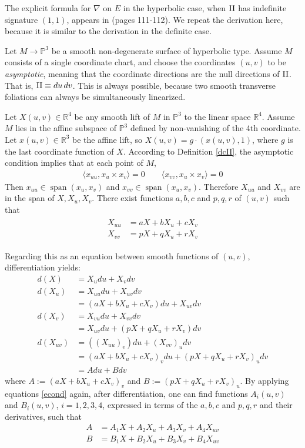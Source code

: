 \documentclass[12pt]{article}
\numberwithin{equation}{section}
\theoremstyle{plain}
\theoremstyle{definition}
\renewcommand{\P}{\mathbb{P}}
\newcommand{\R}{\mathbb{R}}
\newcommand{\II}{\textnormal{II}}
\newcommand{\ra}{\rightarrow}
\begin{document}
The explicit formula for $\nabla$ on $E$ in the hyperbolic case, when $\II$ has indefinite signature $(1,1)$, appears in \cite{to} (pages 111-112). We repeat the derivation here, because it is similar to the derivation in the definite case.

Let $M\ra \P^{3}$ be a smooth non-degenerate surface of hyperbolic type. Assume $M$ consists of a single coordinate chart, and choose the coordinates $(u,v)$ to be \emph{asymptotic}, meaning that the coordinate directions are the null directions of $\II$. That is, $\II\equiv du\thinspace dv$. This is always possible, because two smooth transverse foliations can always be simultaneously linearized.

Let $X(u,v)\in \R^{4}$ be any smooth lift of $M$ in $\P^{3}$ to the linear space $\R^{4}$. Assume $M$ lies in the affine subspace of $\P^{3}$ defined by non-vanishing of the 4th coordinate. Let $x(u,v)\in \R^{3}$ be the affine lift, so $X(u,v)=g\cdot (x(u,v),1)$, where $g$ is the last coordinate function of $X$. According to Definition \ref{dcII}, the asymptotic condition implies that at each point of $M$,
\begin{align*}
\langle x_{uu},x_{u}\times x_{v}\rangle =0 \qquad \langle x_{vv},x_{u}\times x_{v}\rangle=0 
\end{align*}
Then $x_{uu}\in \operatorname{span}(x_{u},x_{v})$ and $x_{vv}\in \operatorname{span}(x_{u},x_{v})$. Therefore $X_{uu}$ and $X_{vv}$ are in the span of $X,X_{u},X_{v}$. There exist functions $a,b,c$ and $p,q,r$ of $(u,v)$ such that
\begin{align}\label{econd}
\begin{split}
X_{uu}&= a X + b X_{u} + c X_{v}\\
X_{vv}&= p X + q X_{u} + r X_{v}
\end{split}
\end{align}

Regarding this as an equation between smooth functions of $(u,v)$, differentiation yields:
\begin{align*}
d(X)&=X_{u}du+X_{v}dv\\
d(X_{u})&=X_{uu}du+X_{uv}dv\\
 &=(aX+bX_{u}+cX_{v})du+X_{uv}dv\\
d(X_{v})&=X_{vu}du+X_{vv}dv\\
 &=X_{uv}du + (pX+qX_{u}+rX_{v})dv\\
d(X_{uv})&=((X_{uu})_{v})du+(X_{vv})_{u}dv\\
 &=(aX+bX_{u}+cX_{v})_{v}du+(pX+qX_{u}+rX_{v})_{u}dv\\
 &=Adu+Bdv
\end{align*}
where $A:=(aX+bX_{u}+cX_{v})_{v}$ and $B:=(pX+qX_{u}+rX_{v})_{u}$. By applying equations \ref{econd} again, after differentiation, one can find functions $A_{i}(u,v)$ and $B_{i}(u,v)$, $i=1,2,3,4$, expressed in terms of the $a,b,c$ and $p,q,r$ and their derivatives, such that
\begin{align*}
A&=A_{1}X+A_{2}X_{u}+A_{3}X_{v}+A_{4}X_{uv}\\
B&=B_{1}X+B_{2}X_{u}+B_{3}X_{v}+B_{4}X_{uv}
\end{align*}
\end{document}
